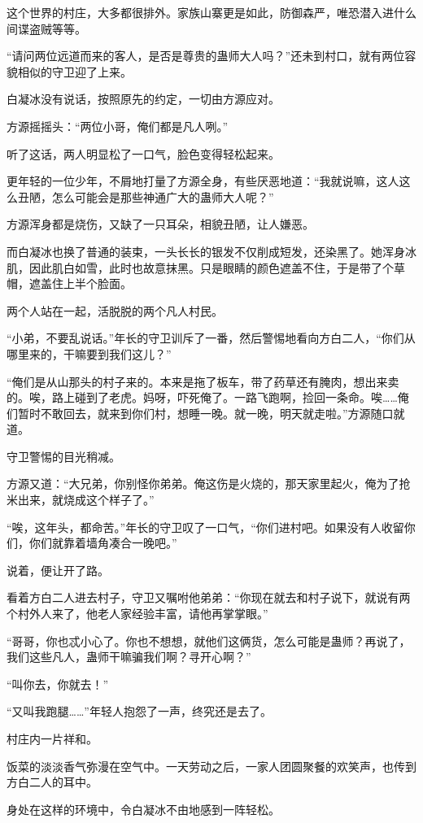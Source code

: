 \begin{this_body}
这个世界的村庄，大多都很排外。家族山寨更是如此，防御森严，唯恐潜入进什么间谍盗贼等等。

“请问两位远道而来的客人，是否是尊贵的蛊师大人吗？”还未到村口，就有两位容貌相似的守卫迎了上来。

白凝冰没有说话，按照原先的约定，一切由方源应对。

方源摇摇头：“两位小哥，俺们都是凡人咧。”

听了这话，两人明显松了一口气，脸色变得轻松起来。

更年轻的一位少年，不屑地打量了方源全身，有些厌恶地道：“我就说嘛，这人这么丑陋，怎么可能会是那些神通广大的蛊师大人呢？”

方源浑身都是烧伤，又缺了一只耳朵，相貌丑陋，让人嫌恶。

而白凝冰也换了普通的装束，一头长长的银发不仅削成短发，还染黑了。她浑身冰肌，因此肌白如雪，此时也故意抹黑。只是眼睛的颜色遮盖不住，于是带了个草帽，遮盖住上半个脸面。

两个人站在一起，活脱脱的两个凡人村民。

“小弟，不要乱说话。”年长的守卫训斥了一番，然后警惕地看向方白二人，“你们从哪里来的，干嘛要到我们这儿？”

“俺们是从山那头的村子来的。本来是拖了板车，带了药草还有腌肉，想出来卖的。唉，路上碰到了老虎。妈呀，吓死俺了。一路飞跑啊，捡回一条命。唉……俺们暂时不敢回去，就来到你们村，想睡一晚。就一晚，明天就走啦。”方源随口就道。

守卫警惕的目光稍减。

方源又道：“大兄弟，你别怪你弟弟。俺这伤是火烧的，那天家里起火，俺为了抢米出来，就烧成这个样子了。”

“唉，这年头，都命苦。”年长的守卫叹了一口气，“你们进村吧。如果没有人收留你们，你们就靠着墙角凑合一晚吧。”

说着，便让开了路。

看着方白二人进去村子，守卫又嘱咐他弟弟：“你现在就去和村子说下，就说有两个村外人来了，他老人家经验丰富，请他再掌掌眼。”

“哥哥，你也忒小心了。你也不想想，就他们这俩货，怎么可能是蛊师？再说了，我们这些凡人，蛊师干嘛骗我们啊？寻开心啊？”

“叫你去，你就去！”

“又叫我跑腿……”年轻人抱怨了一声，终究还是去了。

村庄内一片祥和。

饭菜的淡淡香气弥漫在空气中。一天劳动之后，一家人团圆聚餐的欢笑声，也传到方白二人的耳中。

身处在这样的环境中，令白凝冰不由地感到一阵轻松。


\end{this_body}
